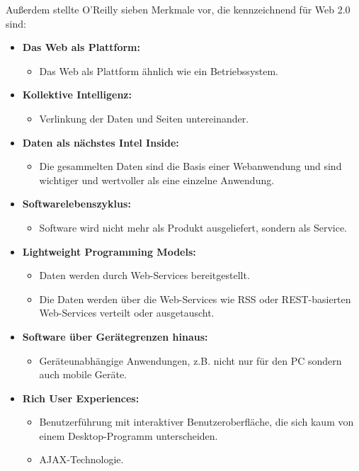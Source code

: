\newpage
Außerdem stellte O’Reilly sieben Merkmale vor, die kennzeichnend für Web 2.0 sind:

\begin{itemize}
\item \textbf{Das Web als Plattform:}
\begin{itemize}
\item Das Web als Plattform ähnlich wie ein Betriebssystem.
\end{itemize}
\item \textbf{Kollektive Intelligenz:}
\begin{itemize}
\item Verlinkung der Daten und Seiten untereinander.
\end{itemize}
\item \textbf{Daten als nächstes Intel Inside:}
\begin{itemize}
\item Die gesammelten Daten sind die Basis einer Webanwendung und sind wichtiger und wertvoller als eine einzelne Anwendung.
\end{itemize}
\item \textbf{Softwarelebenszyklus:}
\begin{itemize}
\item Software wird nicht mehr als Produkt ausgeliefert, sondern als Service.
\end{itemize}
\item \textbf{Lightweight Programming Models:}
\begin{itemize}
\item Daten werden durch Web-Services bereitgestellt.
\end{itemize}
\begin{itemize}
\item Die Daten werden über die Web-Services wie RSS oder REST-basierten Web-Services verteilt oder ausgetauscht.
\end{itemize}
\item \textbf{Software über Gerätegrenzen hinaus:}
\begin{itemize}
\item Geräteunabhängige Anwendungen, z.B. nicht nur für den PC sondern auch mobile Geräte.
\end{itemize}
\item \textbf{Rich User Experiences:}
\begin{itemize}
\item Benutzerführung mit interaktiver Benutzeroberfläche, die sich kaum von einem Desktop-Programm unterscheiden.
\end{itemize}
\begin{itemize}
\item AJAX-Technologie.
\end{itemize}
\end{itemize}

